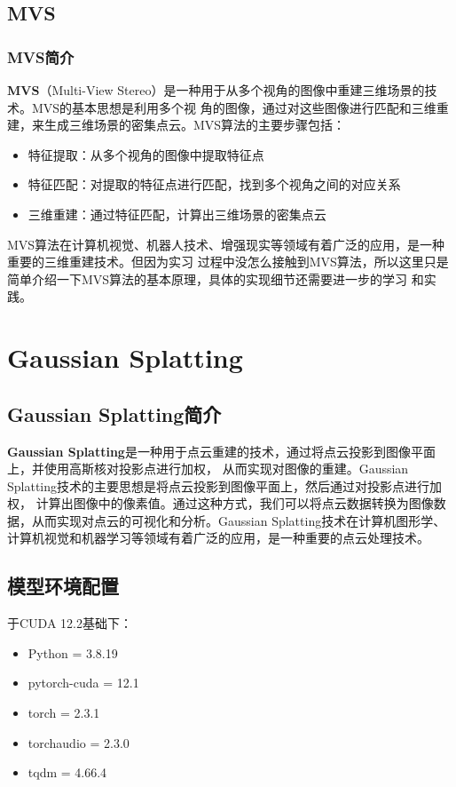 \documentclass{nwputhesis}
\begin{document}
\subsection{MVS}
\subsubsection{MVS简介}
\textbf{MVS}（Multi-View Stereo）是一种用于从多个视角的图像中重建三维场景的技术。MVS的基本思想是利用多个视
角的图像，通过对这些图像进行匹配和三维重建，来生成三维场景的密集点云。MVS算法的主要步骤包括：
\begin{itemize}
    \item 特征提取：从多个视角的图像中提取特征点
    \item 特征匹配：对提取的特征点进行匹配，找到多个视角之间的对应关系
    \item 三维重建：通过特征匹配，计算出三维场景的密集点云
\end{itemize}

\indent
MVS算法在计算机视觉、机器人技术、增强现实等领域有着广泛的应用，是一种重要的三维重建技术。但因为实习
过程中没怎么接触到MVS算法，所以这里只是简单介绍一下MVS算法的基本原理，具体的实现细节还需要进一步的学习
和实践。

\makespace
\section{Gaussian Splatting}
\subsection{Gaussian Splatting简介}
\textbf{Gaussian Splatting}是一种用于点云重建的技术，通过将点云投影到图像平面上，并使用高斯核对投影点进行加权，
从而实现对图像的重建。Gaussian Splatting技术的主要思想是将点云投影到图像平面上，然后通过对投影点进行加权，
计算出图像中的像素值。通过这种方式，我们可以将点云数据转换为图像数据，从而实现对点云的可视化和分析。Gaussian
Splatting技术在计算机图形学、计算机视觉和机器学习等领域有着广泛的应用，是一种重要的点云处理技术。
\subsection{模型环境配置}
\noindent
于CUDA 12.2基础下：
\begin{itemize}
    \item Python = 3.8.19
    \item pytorch-cuda = 12.1
    \item torch = 2.3.1
    \item torchaudio = 2.3.0
    \item tqdm = 4.66.4
\end{itemize}
\end{document}
